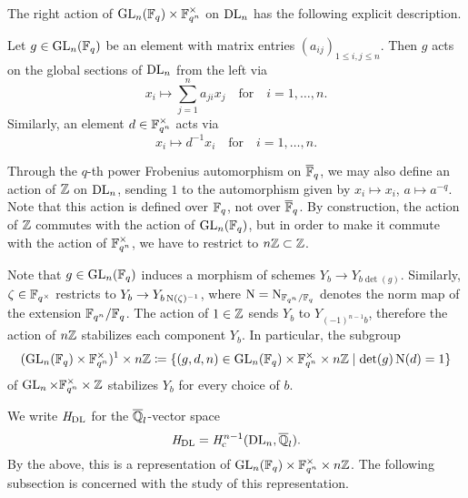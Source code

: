 \documentclass[../main.tex]{subfiles}
\begin{document}
The right action of $\operatorname{GL}_n(\mathbb{F}_q) \times \mathbb{F}_{q^n}^\times$ on $\mathrm{DL}_n$ has the following
explicit description.

\begin{lem}\label{lem:ActionsOnDLn}
  Let $g \in \operatorname{GL}_n(\mathbb{F}_q)$ be an element with matrix entries $(a_{ij})_{1 \leq
  i,j \leq n}$. Then $g$ acts on the global sections of $\mathrm{DL}_n$ from the left via
  \begin{equation*}
    x_i  \mapsto  \sum_{j = 1}^n a_{ji}x_j \quad \text{for} \quad i = 1, \dots, n. 
  \end{equation*}
  Similarly, an element $d \in \mathbb{F}_{q^n}^\times$ acts via
  \begin{equation*}
    x_i \mapsto d^{-1} x_i \quad \text{for} \quad i = 1, \dots, n.
  \end{equation*}
\end{lem}

Through the $q$-th power Frobenius automorphism on $\overline {\mathbb{F}}_q$, we may also
define an action of $\mathbb{Z}$ on $\mathrm{DL}_n$, sending $1$ to the automorphism given by
$x_i \mapsto x_i$, $a \mapsto a^{-q}$. Note that this action is defined over 
$\mathbb{F}_q$, not over $\overline {\mathbb{F}}_q$. 
By construction, the action of $\mathbb{Z}$ commutes with the action of $\operatorname{GL}_n(\mathbb{F}_q)$, 
but in order to make it commute with the action of $\mathbb{F}_{q^n}^\times$, we 
have to restrict to $n\mathbb{Z} \subset \mathbb{Z}$. 

Note that $g \in \operatorname{GL}_n(\mathbb{F}_q)$ induces a morphism of schemes
$Y_b \to Y_{b \det(g)}$. Similarly, $\zeta \in \mathbb{F}_{q^\times}$ 
restricts to $Y_b \to Y_{b \operatorname{N}(\zeta)^{-1}}$, where $\operatorname{N} = \operatorname{N}_{\mathbb{F}_{q^n}/\mathbb{F}_q}$
denotes the norm map of the extension $\mathbb{F}_{q^n}/\mathbb{F}_q$. The action of 
$1 \in \mathbb{Z}$ sends $Y_b$ to $Y_{(-1)^{n-1} b}$, therefore the action of 
$n\mathbb{Z}$ stabilizes each component $Y_b$. In particular, 
the subgroup 
\begin{equation*}
  (\operatorname{GL}_n(\mathbb{F}_q) \times \mathbb{F}_{q^n}^\times)^1 \times n\mathbb{Z} 
  \coloneq \{(g,d,n) \in \operatorname{GL}_n(\mathbb{F}_q) \times \mathbb{F}_{q^n}^\times \times n\mathbb{Z} 
  \mid \det(g) \operatorname{N}(d) = 1\}
\end{equation*}
of $\operatorname{GL}_n \times \mathbb{F}_{q^n}^\times \times \mathbb{Z}$
stabilizes $Y_b$ for every choice of $b$.

We write $\mathit H_{\mathrm{DL}}$ for the $\overline {\mathbb{Q}}_l$-vector space
\begin{equation*}
  \mathit H_{\mathrm{DL}} = \mathit H_{\mathrm{c}}^{n-1}(\mathrm{DL}_n, \overline {\mathbb{Q}}_l).
\end{equation*}
By the above, this is a representation of $\operatorname{GL}_n(\mathbb{F}_q) \times \mathbb{F}_{q^n}^\times
\times n\mathbb{Z}$. The following subsection is concerned with the study of this
representation.
\end{document}
